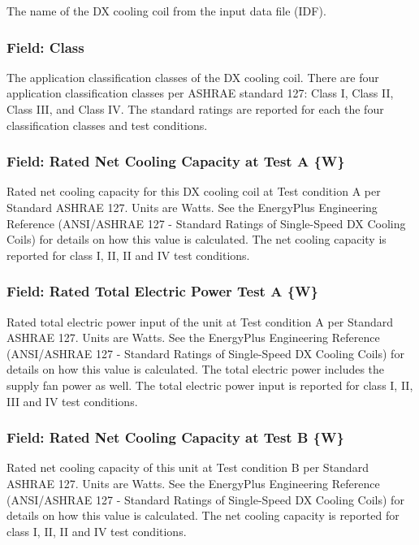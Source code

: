 The name of the DX cooling coil from the input data file (IDF).

\subsubsection{Field: Class}\label{field-class}

The application classification classes of the DX cooling coil. There are four application classification classes per ASHRAE standard 127: Class I, Class II, Class III, and Class IV. The standard ratings are reported for each the four classification classes and test conditions.

\subsubsection{Field: Rated Net Cooling Capacity at Test A \{W\}}\label{field-rated-net-cooling-capacity-at-test-a-w}

Rated net cooling capacity for this DX cooling coil at Test condition A per Standard ASHRAE 127. Units are Watts. See the EnergyPlus Engineering Reference (ANSI/ASHRAE 127 - Standard Ratings of Single-Speed DX Cooling Coils) for details on how this value is calculated. The net cooling capacity is reported for class I, II, II and IV test conditions.

\subsubsection{Field: Rated Total Electric Power Test A \{W\}}\label{field-rated-total-electric-power-test-a-w}

Rated total electric power input of the unit at Test condition A per Standard ASHRAE 127. Units are Watts. See the EnergyPlus Engineering Reference (ANSI/ASHRAE 127 - Standard Ratings of Single-Speed DX Cooling Coils) for details on how this value is calculated. The total electric power includes the supply fan power as well. The total electric power input is reported for class I, II, III and IV test conditions.

\subsubsection{Field: Rated Net Cooling Capacity at Test B \{W\}}\label{field-rated-net-cooling-capacity-at-test-b-w}

Rated net cooling capacity of this unit at Test condition B per Standard ASHRAE 127. Units are Watts. See the EnergyPlus Engineering Reference (ANSI/ASHRAE 127 - Standard Ratings of Single-Speed DX Cooling Coils) for details on how this value is calculated. The net cooling capacity is reported for class I, II, II and IV test conditions.

